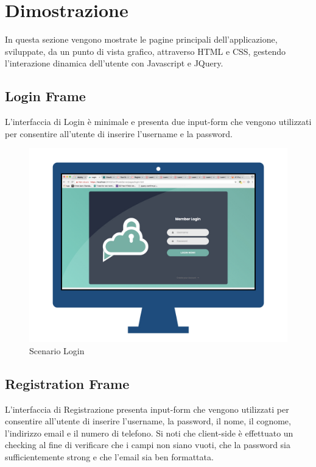 \textual
\chapter{Dimostrazione}

In questa sezione vengono mostrate le pagine principali dell'applicazione, sviluppate, da un punto di vista grafico, attraverso HTML e CSS, gestendo l'interazione dinamica dell'utente con Javascript e JQuery.

\section{Login Frame}

L'interfaccia di Login è minimale e presenta due input-form che vengono utilizzati per consentire all'utente di inserire l'username e la password.

\begin{figure}[!htbp]
	\centering
	\includegraphics[scale = .3]{img/conclusioni002.jpeg}
	\caption{Scenario Login}
	\label{gfx:sdlogin}
\end{figure}

\section{Registration Frame}

L'interfaccia di Registrazione presenta input-form che vengono utilizzati per consentire all'utente di inserire l'username, la password, il nome, il cognome, l'indirizzo email e il numero di telefono. Si noti che client-side è effettuato un checking al fine di verificare che i campi non siano vuoti, che la password sia sufficientemente strong e che l'email sia ben formattata.

